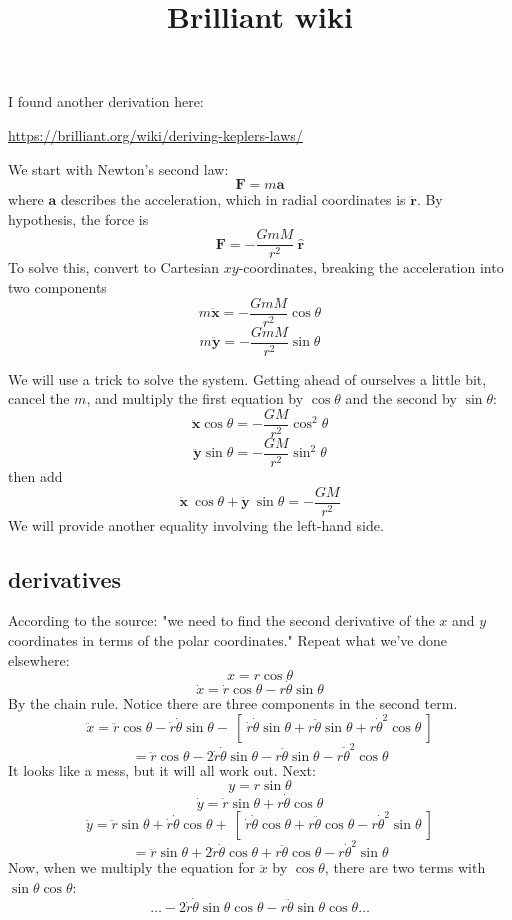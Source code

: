 \documentclass[11pt, oneside]{article}
\title{Brilliant wiki}
\date{}
\begin{document}
\maketitle
\Large
I found another derivation here:

\url{https://brilliant.org/wiki/deriving-keplers-laws/}

We start with Newton's second law:
\[ \mathbf{F} = m\mathbf{a} \] 
where $\mathbf{a}$ describes the acceleration, which in radial coordinates is $\ddot{\mathbf{r}}$.
By hypothesis, the force is
\[ \mathbf{F} = - \frac{GmM}{r^2} \ \hat{\mathbf{r}} \]
To solve this, convert to Cartesian $xy$-coordinates, breaking the acceleration into two components
\[ m \ddot{\mathbf{x}} = - \frac{GmM}{r^2} \cos \theta \]
\[ m \ddot{\mathbf{y}} = - \frac{GmM}{r^2} \sin \theta \]

We will use a trick to solve the system.  Getting ahead of ourselves a little bit, cancel the $m$, and multiply the first equation by $\cos \theta$ and the second by $\sin \theta$:
\[ \ddot{\mathbf{x}} \cos \theta = - \frac{GM}{r^2} \cos^2 \theta \]
\[ \ddot{\mathbf{y}} \sin \theta = - \frac{GM}{r^2} \sin^2 \theta \]
then add
\[ \ddot{\mathbf{x}} \ \cos \theta + \ddot{\mathbf{y}} \ \sin \theta = - \frac{GM}{r^2} \]
We will provide another equality involving the left-hand side.

\subsection*{derivatives}
According to the source:  "we need to find the second derivative of the $x$ and $y$ coordinates in terms of the polar coordinates."  Repeat what we've done elsewhere:
\[ x = r \cos \theta \]
\[ \dot{x} = \dot{r} \cos \theta - r \dot{\theta} \sin \theta \]
By the chain rule.  Notice there are three components in the second term.
\[ \ddot{x} = \ddot{r} \cos \theta - \dot{r}  \dot{\theta} \sin \theta - \ [ \ \dot{r} \dot{\theta} \sin \theta + r \ddot{\theta} \sin \theta +   r \dot{\theta}^2 \cos \theta \ ] \]
\[ = \ddot{r} \cos \theta - 2 \dot{r}  \dot{\theta} \sin \theta - r \ddot{\theta} \sin \theta - r \dot{\theta}^2 \cos \theta \]
It looks like a mess, but it will all work out.  Next:
\[ y = r \sin \theta \]
\[ \dot{y} = \dot{r} \sin \theta + r \dot{\theta} \cos \theta \]
\[ \ddot{y} = \ddot{r} \sin \theta + \dot{r} \dot{\theta} \cos \theta + \ [ \ \dot{r} \dot{\theta} \cos \theta + r \ddot{\theta} \cos \theta - r \dot{\theta}^2 \sin \theta  \ ]  \]
\[ = \ddot{r} \sin \theta + 2 \dot{r} \dot{\theta} \cos \theta + r \ddot{\theta} \cos \theta - r \dot{\theta}^2 \sin \theta  \]
Now, when we multiply the equation for $\ddot{x}$ by $\cos \theta$, there are two terms with $\sin \theta \cos \theta$:
\[ \dots - 2 \dot{r}  \dot{\theta} \sin \theta \cos \theta - r \ddot{\theta} \sin \theta \cos \theta \dots \]
\end{document}
